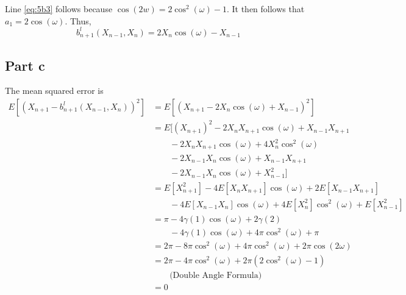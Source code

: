 \documentclass{article}
\begin{document}
Line \eqref{eq:5b3} follows because $\cos(2w) = 2 \cos^2(\omega ) - 1$.
It then follows that $a_1 = 2\cos(\omega )$.
Thus,
$$
b_{n+1}^l(X_{n - 1}, X_n) = 2 X_n \cos(\omega) - X_{n - 1}
$$

\subsection*{Part c}
The mean squared error is
\begin{align*}
  E[(X_{n + 1} - b_{n+1}^l(X_{n - 1}, X_n))^2] &= E[(X_{n + 1} - 2 X_n \cos(\omega) + X_{n - 1})^2]\\
  &= E[(X_{n + 1})^2 - 2 X_n X_{n + 1} \cos(\omega) + X_{n - 1}X_{n + 1}\\
  & \qquad -2X_n X_{n + 1} \cos(\omega) + 4 X_n^2 \cos^2(\omega)\\
  & \qquad - 2 X_{n - 1}X_n \cos(\omega) + X_{n - 1} X_{n + 1}\\
  & \qquad - 2 X_{n -1} X_n \cos(\omega) + X^2_{n - 1}
  ]\\
  &= E[X_{n + 1}^2] - 4 E[X_n X_{n + 1}] \cos(\omega) + 2 E[X_{n - 1}X_{n + 1}]\\
  & \qquad - 4 E[X_{n - 1} X_n] \cos(\omega) + 4 E[X_n^2] \cos^2(\omega) + E[X_{n - 1}^2]\\
  &= \pi - 4 \gamma(1) \cos(\omega) + 2 \gamma(2)\\
  & \qquad - 4 \gamma(1) \cos(\omega) + 4 \pi \cos^2(\omega) + \pi\\
  &= 2\pi - 8 \pi \cos^2(\omega) + 4 \pi \cos^2(\omega) + 2 \pi \cos(2\omega)\\
  &= 2\pi - 4 \pi \cos^2(\omega) + 2 \pi (2 \cos^2(\omega) - 1)\\
  & \qquad \text{(Double Angle Formula)}\\
  &= 0
\end{align*}
\end{document}
